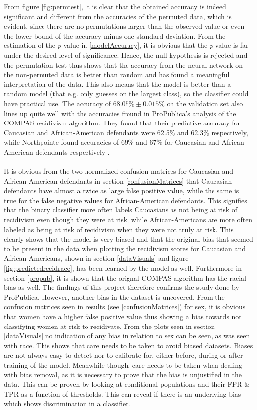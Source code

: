 \documentclass[11pt, fleqn, titlepage]{article}
\begin{document}
	From figure \ref{fig:permtest}, it is clear that the obtained accuracy is indeed significant and different from the accuracies of the permuted data, which is evident, since there are no permutations larger than the observed value or even the lower bound of the accuracy minus one standard deviation. From the estimation of the \textit{p}-value in \ref{modelAccuracy}, it is obvious that the \textit{p}-value is far under the desired level of significance. Hence, the null hypothesis is rejected and the permutation test thus shows that the accuracy from the neural network on the non-permuted data is better than random and has found a meaningful interpretation of the data. This also means that the model is better than a random model (that e.g. only guesses on the largest class), so the classifier could have practical use. The accuracy of $68.05\% \pm 0.015\%$ on the validation set also lines up quite well with the accuracies fround in ProPublica's analysis of the COMPAS recidivism algorithm. They found that their predictive accuracy for Caucasian and African-American defendants were 62.5\% and 62.3\% respectively, while Northpointe found accuracies of 69\% and 67\% for Caucasian and African-American defendants respectively \cite{propublicaAnalysis}. \\\\
	\noindent
	It is obvious from the two normalized confusion matrices for Caucasian and African-American defendants in section \ref{confusionMatrices} that Caucasian defendants have almost a twice as large false positive value, while the same is true for the false negative values for African-American defendants. This signifies that the binary classifier more often labels Caucasians as not being at risk of recidivism even though they were at risk, while African-Americans are more often labeled as being at risk of recidivism when they were not truly at risk. This clearly shows that the model is very biased and that the original bias that seemed to be present in the data when plotting the recidivism scores for Caucasian and African-Americans, shown in section \ref{dataVisuals} and figure \ref{fig:predictedrecidrace}, has been learned by the model as well. Furthermore in section \ref{propub}, it is shown that the orignal COMPAS-algorithm has the racial bias as well. The findings of this project therefore confirms the study done by ProPublica. However, another bias in the dataset is uncovered. From the confusion matrices seen in results (see \ref{confusionMatrices}) for sex, it is obvious that women have a higher false positive value thus showing a bias towards not classifying women at risk to recidivate. From the plots seen in section \ref{dataVisuals} no indication of any bias in relation to sex can be seen, as was seen with race. This shows that care needs to be taken to avoid biased datasets. Biases are not always easy to detect nor to calibrate for, either before, during or after training of the model. Meanwhile though, care needs to be taken when dealing with bias removal, as it is necessary to prove that the bias is unjustified in the data. This can be proven by looking at conditional populations and their FPR \& TPR as a function of thresholds. This can reveal if there is an underlying bias which shows discrimination in a classifier. 
	
\end{document}
